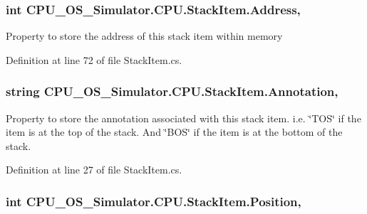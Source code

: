 \subsubsection[{Address}]{\setlength{\rightskip}{0pt plus 5cm}int C\+P\+U\+\_\+\+O\+S\+\_\+\+Simulator.\+C\+P\+U.\+Stack\+Item.\+Address\hspace{0.3cm}{\ttfamily [get]}, {\ttfamily [set]}}\label{class_c_p_u___o_s___simulator_1_1_c_p_u_1_1_stack_item_a44f4c5bd346e25e81c54b01012768bc5}


Property to store the address of this stack item within memory 



Definition at line 72 of file Stack\+Item.\+cs.

\hypertarget{class_c_p_u___o_s___simulator_1_1_c_p_u_1_1_stack_item_a13f182fa7a19bcb7d78aadbd4cc04c98}{}
\subsubsection[{Annotation}]{\setlength{\rightskip}{0pt plus 5cm}string C\+P\+U\+\_\+\+O\+S\+\_\+\+Simulator.\+C\+P\+U.\+Stack\+Item.\+Annotation\hspace{0.3cm}{\ttfamily [get]}, {\ttfamily [set]}}\label{class_c_p_u___o_s___simulator_1_1_c_p_u_1_1_stack_item_a13f182fa7a19bcb7d78aadbd4cc04c98}


Property to store the annotation associated with this stack item. i.\+e. \char`\"{}\+T\+O\+S\char`\"{} if the item is at the top of the stack. And \char`\"{}\+B\+O\+S\char`\"{} if the item is at the bottom of the stack. 



Definition at line 27 of file Stack\+Item.\+cs.

\hypertarget{class_c_p_u___o_s___simulator_1_1_c_p_u_1_1_stack_item_aa2e46f703d2a81a32d38f12df3718909}{}
\subsubsection[{Position}]{\setlength{\rightskip}{0pt plus 5cm}int C\+P\+U\+\_\+\+O\+S\+\_\+\+Simulator.\+C\+P\+U.\+Stack\+Item.\+Position\hspace{0.3cm}{\ttfamily [get]}, {\ttfamily [set]}}\label{class_c_p_u___o_s___simulator_1_1_c_p_u_1_1_stack_item_aa2e46f703d2a81a32d38f12df3718909}


